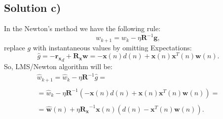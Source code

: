 \documentclass[a4paper, 12pt]{article}
\begin{document}
\subsection*{Solution c)}
In the Newton's method we have the following rule:
\begin{equation*}
  w_{k+1} = w_{k} - \eta \mathbf{R}^{-1}\mathbf{g},
\end{equation*}
replace $g$ with instantaneous values by omitting Expectations:
\begin{equation*}
  \hat{g} = - \mathbf{r_x}_d +\mathbf{R_x}\mathbf{w} = -\mathbf{x}(n)d(n) + \mathbf{x}(n)\mathbf{x}^T(n)\mathbf{w}(n).
\end{equation*}
So, LMS/Newton algorithm will be:
$$
\begin{array}{l}
  \hat{w}_{k+1} = \hat{w}_{k} - \eta \mathbf{R}^{-1}\hat{g} =\\
  \\
  =\hat{w}_{k} - \eta \mathbf{R}^{-1}(-\mathbf{x}(n)d(n) + \mathbf{x}(n)\mathbf{x}^T(n)\mathbf{w}(n)) =\\
  \\
  =\mathbf{\hat{w}}(n)+\eta \mathbf{R_x}^{-1} \mathbf{x}(n)(d(n) - \mathbf{x}^T(n) \mathbf{w}(n) ).
\end{array}
$$
\end{document}

